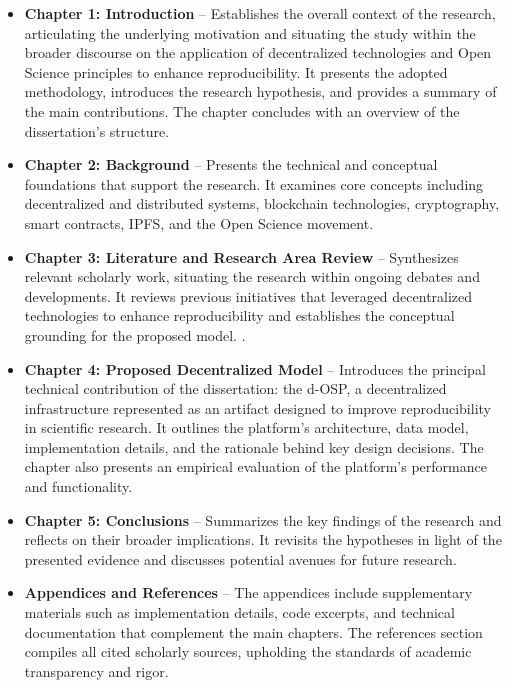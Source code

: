 \documentclass[final]{rc-book-2.14}
\begin{document}
\begin{itemize}
    \item \textbf{Chapter 1: Introduction} – Establishes the overall context of the research, articulating the underlying motivation and situating the study within the broader discourse on the application of decentralized technologies and Open Science principles to enhance reproducibility. It presents the adopted methodology, introduces the research hypothesis, and provides a summary of the main contributions. The chapter concludes with an overview of the dissertation's structure.

    \item \textbf{Chapter 2: Background} – Presents the technical and conceptual foundations that support the research. It examines core concepts including decentralized and distributed systems, blockchain technologies, cryptography, smart contracts, IPFS, and the Open Science movement.

    \item \textbf{Chapter 3: Literature and Research Area Review} – Synthesizes relevant scholarly work, situating the research within ongoing debates and developments. It reviews previous initiatives that leveraged decentralized technologies to enhance reproducibility and establishes the conceptual grounding for the proposed model.
          .
    \item \textbf{Chapter 4: Proposed Decentralized Model} – Introduces the principal technical contribution of the dissertation: the d-OSP, a decentralized infrastructure represented as an artifact designed to improve reproducibility in scientific research. It outlines the platform’s architecture, data model, implementation details, and the rationale behind key design decisions. The chapter also presents an empirical evaluation of the platform’s performance and functionality.

    \item \textbf{Chapter 5: Conclusions} – Summarizes the key findings of the research and reflects on their broader implications. It revisits the hypotheses in light of the presented evidence and discusses potential avenues for future research.

    \item \textbf{Appendices and References} – The appendices include supplementary materials such as implementation details, code excerpts, and technical documentation that complement the main chapters. The references section compiles all cited scholarly sources, upholding the standards of academic transparency and rigor.

\end{itemize}
\end{document}
